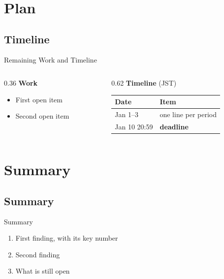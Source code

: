 \documentclass[aspectratio=169,10pt]{beamer}
\begin{document}
\section{Plan}

\subsection{Timeline}
\begin{frame}{Remaining Work and Timeline}
  \begin{columns}[T]
    \begin{column}{0.36\textwidth}
      \small
      \textbf{Work}
      \begin{itemize}
        \item First open item
        \item Second open item
      \end{itemize}
    \end{column}
    \begin{column}{0.62\textwidth}
      \small
      \textbf{Timeline} (JST)\\[2pt]
      \footnotesize
      \begin{tabular}{@{}ll@{}}
        \toprule
        Date & Item \\
        \midrule
        Jan 1--3 & one line per period \\
        Jan 10 20:59 & \textbf{deadline} \\
        \bottomrule
      \end{tabular}
    \end{column}
  \end{columns}
\end{frame}

\section{Summary}

\subsection{Summary}
\begin{frame}{Summary}
  \begin{enumerate}
    \item First finding, with its key number
    \item Second finding
    \item What is still open
  \end{enumerate}
\end{frame}
\end{document}
